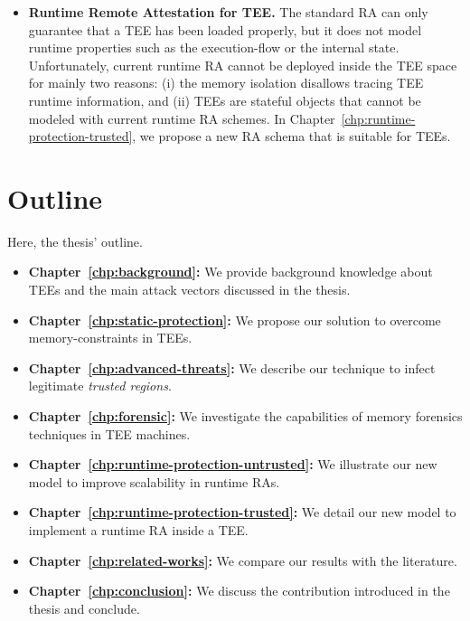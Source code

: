 \begin{itemize}
	\item[\circledrA{5}]
	\textbf{Runtime Remote Attestation for TEE.} 
	The standard RA can only guarantee that a TEE has been 
	loaded properly, but it does not model runtime properties such as the 
	execution-flow or the internal state.
	Unfortunately, current runtime RA cannot be deployed inside the TEE space
	for mainly two reasons: (i) the memory isolation disallows tracing TEE
	runtime information, and (ii) TEEs are stateful objects that cannot be 
	modeled with current runtime RA schemes.
	In Chapter~\ref{chp:runtime-protection-trusted}, we propose a new RA schema 
	that is suitable for TEEs.
	
\end{itemize}

\section{Outline}
\label{sec:outline}

Here, the thesis' outline.

\begin{itemize}[label={}]
	\item \textbf{Chapter~\ref{chp:background}:} We provide background 
	knowledge about TEEs and the main attack vectors discussed in the thesis.
	\item \textbf{Chapter~\ref{chp:static-protection}:} We propose our solution 
	to overcome memory-constraints in TEEs.
	\item \textbf{Chapter~\ref{chp:advanced-threats}:} We describe our 
	technique to infect legitimate \emph{trusted regions}.
	\item \textbf{Chapter~\ref{chp:forensic}:} We investigate the capabilities 
	of 	memory forensics techniques in TEE machines.
	\item \textbf{Chapter~\ref{chp:runtime-protection-untrusted}:} We 
	illustrate our new model to improve scalability in runtime RAs.
	\item \textbf{Chapter~\ref{chp:runtime-protection-trusted}:} We detail our 
	new model to implement a runtime RA inside a TEE.
	\item \textbf{Chapter~\ref{chp:related-works}:} We compare our results 
	with the literature.
	\item \textbf{Chapter~\ref{chp:conclusion}:} We discuss the contribution 
	introduced in the thesis and conclude.
\end{itemize}

